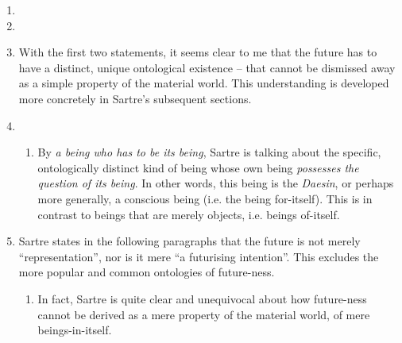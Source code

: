 \begin{enumerate}
  \item {}
  \item {}
  \item With the first two statements,  it seems clear to me that the future has to have a distinct, unique ontological existence -- that cannot be dismissed away as a simple property of the material world. This understanding is developed more concretely in Sartre's subsequent sections.
  \item {}
  \begin{enumerate}
    \item By \emph{a being who has to be its being}, Sartre is talking about the specific, ontologically distinct kind of being whose own being \emph{possesses the question of its being}. In other words, this being is the \emph{Daesin}, or perhaps more generally, a conscious being (i.e. the being for-itself). This is in contrast to beings that are merely objects, i.e. beings of-itself.
  \end{enumerate}
  \item Sartre states in the following paragraphs that the future is not merely \enquote{representation}, nor is it mere \enquote{a futurising intention}. This excludes the more popular and common ontologies of future-ness.
  \begin{enumerate}
    \item In fact, Sartre is quite clear and unequivocal about how future-ness cannot be derived as a mere property of the material world, of mere beings-in-itself.

\end{enumerate}
\end{enumerate}
